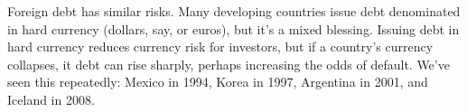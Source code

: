 \begin{itemize}
Foreign debt has similar risks.
Many developing countries issue debt denominated in hard currency
(dollars, say, or euros), but it's a mixed blessing.
Issuing debt in hard currency reduces currency risk for investors,
but if a country's currency collapses,
it debt can rise sharply,
perhaps increasing the odds of default.
We've seen this repeatedly:  Mexico in 1994, Korea in 1997, Argentina in 2001,
and Iceland in 2008. 
\end{itemize}

\begin{comment}
If you’ve lost track of the plot, here’s a summary – or enter “Argentina” in the search box. The short version: Argentina issued bonds in New York in the distant past, and then defaulted on them. They came to an agreement with most of the bondholders to accept a massive haircut, exchanging their bonds for new ones worth roughly 30%

This is my understanding of what’s at stake. But note: I’m not a lawyer, although I sometimes play one in class.

The judgement. The first episode aired yesterday, with a ruling from the Second Circuit of the US Court of Appeals. The judge’s decision is wonderfully clear (lightly edited):

To enhance the marketability of [its] bonds, Argentina made a series of promises to the purchasers. Argentina promised periodic interest payments. Argentina promised that the bonds would be governed by New York law. Argentina promised that any disputes concerning the bonds could be adjudicated in the courts of New York. Argentina promised that each bond would be transferrable, whether to a university endowment, a so-called “vulture fund,” or a widow or an orphan. Finally, Argentina promised to treat the bonds at least equally with its other external indebtedness. By defaulting, enacting legislation specifically forbidding future payment on them, and continuing to pay interest on subsequently issued debt, Argentina breached its promise of equal treatment.


\end{comment}
